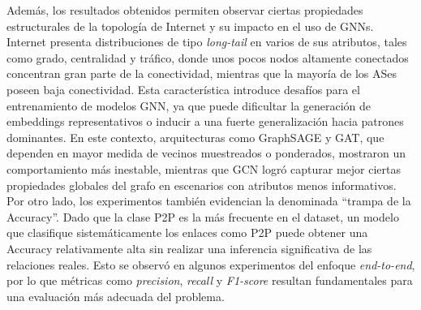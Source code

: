     
    
    
    




Además, los resultados obtenidos permiten observar ciertas propiedades estructurales de la topología de Internet y su impacto en el uso de GNNs. Internet presenta distribuciones de tipo \textit{long-tail} en varios de sus atributos, tales como grado, centralidad y tráfico, donde unos pocos nodos altamente conectados concentran gran parte de la conectividad, mientras que la mayoría de los ASes poseen baja conectividad. Esta característica introduce desafíos para el entrenamiento de modelos GNN, ya que puede dificultar la generación de embeddings representativos o inducir a una fuerte generalización hacia patrones dominantes. En este contexto, arquitecturas como GraphSAGE y GAT, que dependen en mayor medida de vecinos muestreados o ponderados, mostraron un comportamiento más inestable, mientras que GCN logró capturar mejor ciertas propiedades globales del grafo en escenarios con atributos menos informativos.\\

Por otro lado, los experimentos también evidencian la denominada ``trampa de la Accuracy''. Dado que la clase P2P es la más frecuente en el dataset, un modelo que clasifique sistemáticamente los enlaces como P2P puede obtener una Accuracy relativamente alta sin realizar una inferencia significativa de las relaciones reales. Esto se observó en algunos experimentos del enfoque \textit{end-to-end}, por lo que métricas como \textit{precision}, \textit{recall} y \textit{F1-score} resultan fundamentales para una evaluación más adecuada del problema.\\

